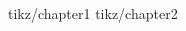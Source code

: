 \documentclass[a4paper,10pt,twoside]{book}
\begin{document}
\begin{CJK}{UTF8}{song}

\CJKtilde
\sloppy\CJKspace
\CJKindent
 {tikz/chapter1}
 {tikz/chapter2}
\newpage
\printindex
\newpage
\end{CJK}
\end{document}
